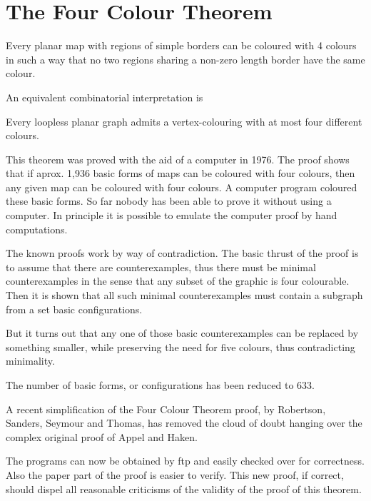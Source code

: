 \section{The Four Colour Theorem}

\bigskip

\begin{teo}

    Every planar map with regions of simple borders can be coloured
    with 4 colours in such a way that no two regions sharing a non-zero
    length border have the same colour.
\end{teo}

An equivalent combinatorial interpretation is
\begin{teo}
Every loopless planar graph admits a vertex-colouring with at most four 
different colours.
\end{teo}

    This theorem was proved with the aid of a computer in 1976.
    The proof shows that if aprox. 1,936  basic forms of maps
    can be coloured with four colours, then any given map can be
    coloured with four colours. A computer program coloured these
    basic forms. So far nobody has been able to prove it without
    using a computer. In principle it is possible to emulate the
    computer proof by hand computations.

    The known proofs work by way of contradiction. The basic thrust 
    of the proof 
    is to assume that there are counterexamples, thus there must
    be minimal counterexamples in the sense that any subset of the
    graphic is four colourable. Then it is shown that all such 
    minimal counterexamples must contain a subgraph from a set basic 
    configurations. 

    But it turns out that any one of those basic counterexamples 
    can  be replaced by something smaller, while preserving the
    need for five colours, thus contradicting minimality.

    The number of basic forms, or configurations has been reduced to
    633.     

    A recent simplification of the Four Colour Theorem proof,
    by Robertson, Sanders, Seymour and Thomas, has removed the cloud
    of doubt hanging over the complex original proof of Appel and 
    Haken.

    The programs can now be obtained by ftp and easily checked over
    for correctness. Also the paper part of the proof is easier to
    verify. This new proof, if correct, should dispel all 
    reasonable criticisms of the validity of the proof of this
    theorem.

